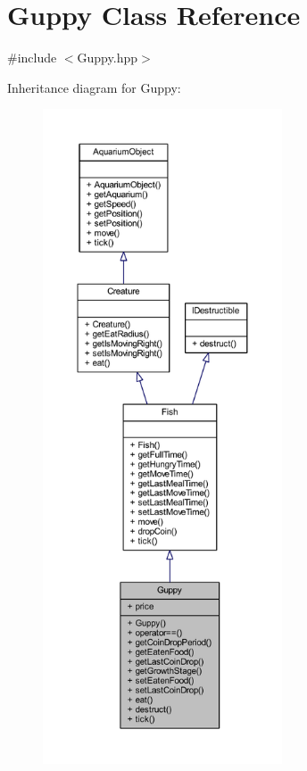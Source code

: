 \hypertarget{class_guppy}{}\section{Guppy Class Reference}
\label{class_guppy}


{\ttfamily \#include $<$Guppy.\+hpp$>$}



Inheritance diagram for Guppy\+:\nopagebreak
\begin{figure}[H]
\begin{center}
\leavevmode
\includegraphics[height=550pt]{class_guppy__inherit__graph}
\end{center}
\end{figure}


